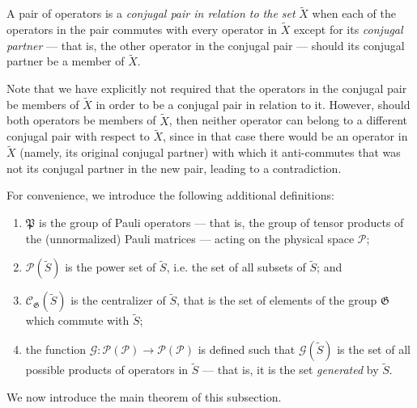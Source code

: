 \documentclass[twocolumn,showpacs,preprintnumbers,amsmath,amssymb,nofootinbib,pra,floatfix]{revtex4}
\newenvironment{definition}[1][Definition]{\begin{trivlist}
\item[\hskip \labelsep {\bfseries #1}]}{\end{trivlist}}
\newcommand{\set}{\tilde}
\newcommand{\genfun}{\mathcal{G}}
\newcommand{\pauligroup}{\mathfrak{P}}
\newcommand{\powerset}{\mathcal{P}}
\newcommand{\centralizer}{\mathcal{C}}
\begin{document}
\begin{definition} A pair of operators is a \emph{conjugal pair in relation to the set} $\set X$ when each of the operators in the pair commutes with every operator in $\set X$ except for its \emph{conjugal partner} --- that is, the other operator in the conjugal pair --- should its conjugal partner be a member of $\set X$.
\end{definition}

Note that we have explicitly not required that the operators in the conjugal pair be members of $\set X$ in order to be a conjugal pair in relation to it.  However, should both operators be members of $\set X$, then neither operator can belong to a different conjugal pair with respect to $\set X$, since in that case there would be an operator in $\set X$ (namely, its original conjugal partner) with which it anti-commutes that was not its conjugal partner in the new pair, leading to a contradiction.

For convenience, we introduce the following additional definitions:

\begin{definition}

\begin{enumerate}
\item $\pauligroup$ is the group of Pauli operators --- that is, the group of tensor products of the (unnormalized) Pauli matrices --- acting on the physical space $\mathscr{P}$;
\item $\powerset(\set S)$ is the power set of $\set S$, i.e. the set of all subsets of $\set S$; and
\item $\centralizer_\mathfrak{G}(\set S)$ is the centralizer of $\set S$, that is the set of elements of the group $\mathfrak{G}$ which commute with $\set S$;
\item the function $\genfun:\powerset(\mathscr{P})\to\powerset(\mathscr{P})$ is defined such that $\genfun(\set S)$ is the set of all possible products of operators in $\set S$ --- that is, it is the set \emph{generated} by $\set S$.
\end{enumerate}

\end{definition}

We now introduce the main theorem of this subsection.
\end{document}
